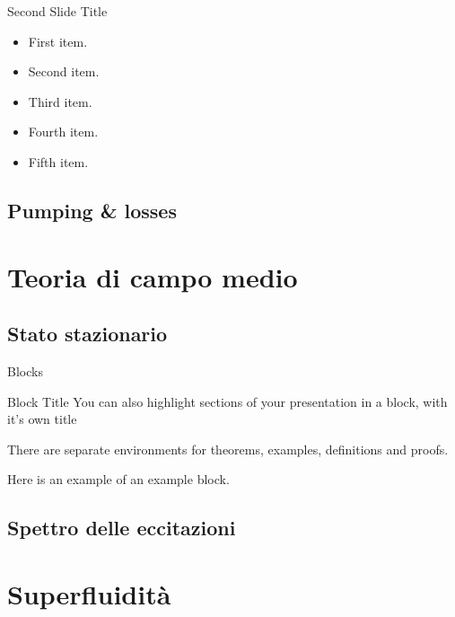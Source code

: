 \documentclass[10pt]{beamer}
\begin{document}
\begin{frame}{Second Slide Title}
  \begin{itemize}
  \item {
    First item.
    \pause %
  }
  \item {   
    Second item.
  }
  \item<3-> {
    Third item.
  }
  \item<4-> {
    Fourth item.
  }
  \item<5-> {
    Fifth item. 
  }
  \end{itemize}
\end{frame}

\subsection{Pumping \& losses}

\section{Teoria di campo medio}
\subsection{Stato stazionario}

\begin{frame}{Blocks}
\begin{block}{Block Title}
You can also highlight sections of your presentation in a block, with it's own title
\end{block}
\begin{theorem}
There are separate environments for theorems, examples, definitions and proofs.
\end{theorem}
\begin{example}
Here is an example of an example block.
\end{example}
\end{frame}

\subsection{Spettro delle eccitazioni}

\section{Superfluidità}
\end{document}
